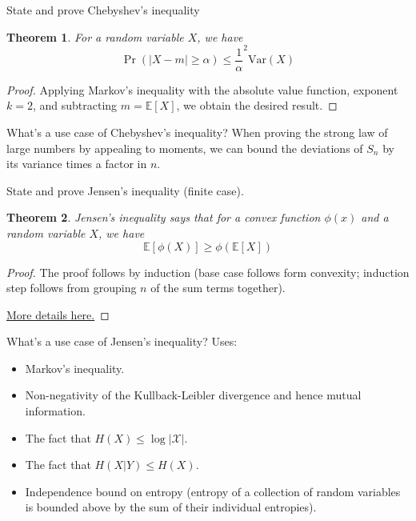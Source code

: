 \documentclass[avery5388,grid,frame]{flashcards}
\newcommand{\E}{\mathbb{E}}
\newcommand{\Var}{\text{Var}}
\newtheorem*{theorem}{Theorem}
\begin{document}
\begin{flashcard}
    {State and prove Chebyshev's inequality}
    \begin{theorem}
        For a random variable $X$, we have
        $$\Pr(|X - m| \geq \alpha) \leq \frac 1 \alpha^2 \Var(X)$$
    \end{theorem}

    \begin{proof}
        Applying Markov's inequality with the absolute value function, exponent $k=2$, and subtracting $m = \E[X]$, we obtain the desired result.
    \end{proof}
\end{flashcard}


\begin{flashcard}
    {What's a use case of Chebyshev's inequality?}
    When proving the strong law of large numbers by appealing to moments, we can bound the deviations of $S_n$ by its variance times a factor in $n$.
\end{flashcard}


\begin{flashcard}
    {State and prove Jensen's inequality (finite case).}
    \begin{theorem}
        Jensen's inequality says that for a convex function $\phi(x)$ and a random variable $X$, we have
        $$\E[\phi(X)] \geq \phi(\E[X])$$
    \end{theorem}

    \begin{proof}
        The proof follows by induction (base case follows form convexity; induction step follows from grouping $n$ of the sum terms together).

        \href{https://en.wikipedia.org/wiki/Jensen%27s_inequality#Proofs}{More details here.}
    \end{proof}
\end{flashcard}


\begin{flashcard}
    {What's a use case of Jensen's inequality?}
    Uses:
    \begin{itemize}
        \item Markov's inequality.
        \item Non-negativity of the Kullback-Leibler divergence and hence mutual information.
        \item The fact that $H(X) \leq \log | \mathcal X |$.
        \item The fact that $H(X | Y) \leq H(X)$.
        \item Independence bound on entropy (entropy of a collection of random variables is bounded above by the sum of their individual entropies).
    \end{itemize}
\end{flashcard}
\end{document}
